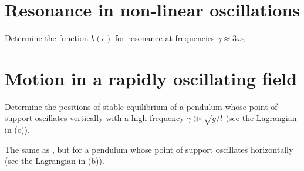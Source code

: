 \section{Resonance in non-linear oscillations}


\begin{problem}[title={Non-linear resonance near three times \texorplain{$\omega_0$}{ω₀}}]
{
Determine the function $b(\epsilon)$ for resonance at frequencies $\gamma \approx 3\omega_0$.
}
{}
{}
\end{problem}

\section{Motion in a rapidly oscillating field}


\begin{problem}[title={Kapitza pendulum: vertically vibrating pivot}]
{
Determine the positions of stable equilibrium of a pendulum whose point of support oscillates vertically with a high frequency $\gamma \gg \sqrt{g/l}$ (see the Lagrangian in (c)).
}
{}
{}
\end{problem}


\begin{problem}[title={Pendulum with a horizontally vibrating pivot}]
{
The same as , but for a pendulum whose point of support oscillates horizontally (see the Lagrangian in (b)).
}
{}
{}
\end{problem}
